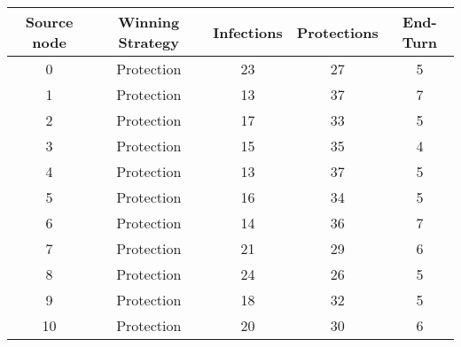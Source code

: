 \documentclass[results.tex]{subfiles}
\begin{document}
    \begin{center}
        \begin{tabular}{| c || c | c | c | c |}
            \hline
            {\bfseries Source node} & {\bfseries Winning Strategy} & {\bfseries Infections} & {\bfseries Protections}
            & {\bfseries End-Turn}
            \\  %
            \hline\hline
            0                       & Protection                   & 23                     & 27                      & 5                    \\
            \hline
            1                       & Protection                   & 13                     & 37                      & 7                    \\
            \hline
            2                       & Protection                   & 17                     & 33                      & 5                    \\
            \hline
            3                       & Protection                   & 15                     & 35                      & 4                    \\
            \hline
            4                       & Protection                   & 13                     & 37                      & 5                    \\
            \hline
            5                       & Protection                   & 16                     & 34                      & 5                    \\
            \hline
            6                       & Protection                   & 14                     & 36                      & 7                    \\
            \hline
            7                       & Protection                   & 21                     & 29                      & 6                    \\
            \hline
            8                       & Protection                   & 24                     & 26                      & 5                    \\
            \hline
            9                       & Protection                   & 18                     & 32                      & 5                    \\
            \hline
            10                      & Protection                   & 20                     & 30                      & 6                    \\

\end{tabular}
\end{center}
\end{document}
